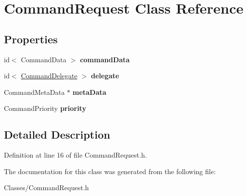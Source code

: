 \hypertarget{interface_command_request}{
\section{CommandRequest Class Reference}
\label{interface_command_request}
}
\subsection*{Properties}
\begin{DoxyCompactItemize}
\item 
\hypertarget{interface_command_request_a270dedc034f427b237cc55d3d0100fd2}{
id$<$ CommandData $>$ {\bfseries commandData}}
\label{interface_command_request_a270dedc034f427b237cc55d3d0100fd2}

\item 
\hypertarget{interface_command_request_af7f6dd890bdb858a410c836e0fc38d9f}{
id$<$ \hyperlink{protocol_command_delegate-p}{CommandDelegate} $>$ {\bfseries delegate}}
\label{interface_command_request_af7f6dd890bdb858a410c836e0fc38d9f}

\item 
\hypertarget{interface_command_request_acfb2c576a94b99b56b005c89e13ba08a}{
CommandMetaData $\ast$ {\bfseries metaData}}
\label{interface_command_request_acfb2c576a94b99b56b005c89e13ba08a}

\item 
\hypertarget{interface_command_request_a0ee28e9b610bed687b3d4fddd2aee5c0}{
CommandPriority {\bfseries priority}}
\label{interface_command_request_a0ee28e9b610bed687b3d4fddd2aee5c0}

\end{DoxyCompactItemize}


\subsection{Detailed Description}


Definition at line 16 of file CommandRequest.h.



The documentation for this class was generated from the following file:\begin{DoxyCompactItemize}
\item 
Classes/CommandRequest.h\end{DoxyCompactItemize}
